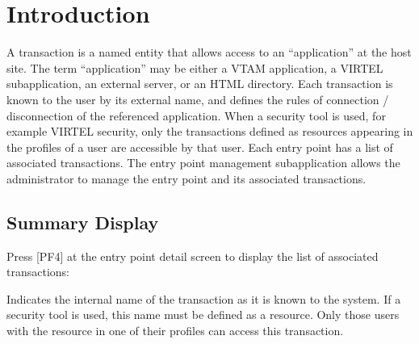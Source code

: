 \documentclass[letterpaper,10pt,english]{sphinxmanual}
\begin{document}
\section{Introduction}
\label{\detokenize{connectivity_guide:id61}}
\sphinxAtStartPar
A transaction is a named entity that allows access to an “application” at the host site. The term “application” may be either a VTAM application, a VIRTEL sub\sphinxhyphen{}application, an external server, or an HTML directory. Each transaction is known to the user by its external name, and defines the rules of connection / disconnection of the referenced application. When a security tool is used, for example VIRTEL security, only the transactions defined as resources appearing in the profiles of a user are accessible by that user. Each entry point has a list of associated transactions. The entry point management sub\sphinxhyphen{}application allows the administrator to manage the entry point and its associated transactions.

\ignorespaces 

\subsection{Summary Display}
\label{\detokenize{connectivity_guide:index-113}}\label{\detokenize{connectivity_guide:id62}}
\sphinxAtStartPar
Press {[}PF4{]} at the entry point detail screen to display the list of associated transactions:

\sphinxAtStartPar
{}

\sphinxAtStartPar
{}
\begin{description}
\sphinxAtStartPar
Indicates the internal name of the transaction as it is known to the system. If a security tool is used, this name must be defined as a resource. Only those users with the resource in one of their profiles can access this transaction.

\end{description}
\end{document}
